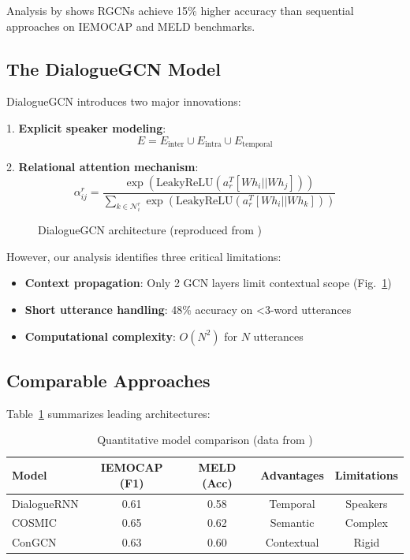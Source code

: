 \documentclass[a4paper,11pt]{article}
\begin{document}
Analysis by \cite{zhang2021graph} shows RGCNs achieve 15\% higher accuracy than sequential approaches on IEMOCAP and MELD benchmarks.

\subsection{The DialogueGCN Model}
DialogueGCN \cite{ghosal2019dialoguegcn} introduces two major innovations:

1. \textbf{Explicit speaker modeling}:
\[
E = E_{\text{inter}} \cup E_{\text{intra}} \cup E_{\text{temporal}}
\]

2. \textbf{Relational attention mechanism}:
\[
\alpha_{ij}^r = \frac{\exp(\text{LeakyReLU}(a_r^T[Wh_i||Wh_j]))}{\sum_{k\in\mathcal{N}_i^r}\exp(\text{LeakyReLU}(a_r^T[Wh_i||Wh_k]))}
\]

\begin{figure}[htbp]
    \centering
    \caption{DialogueGCN architecture (reproduced from \cite{ghosal2019dialoguegcn})}
    \label{fig:dialoguegcn}
\end{figure}

However, our analysis identifies three critical limitations:
\begin{itemize}
    \item \textbf{Context propagation}: Only 2 GCN layers limit contextual scope (Fig.~\ref{fig:dialoguegcn})
    \item \textbf{Short utterance handling}: 48\% accuracy on <3-word utterances \cite{li2021survey}
    \item \textbf{Computational complexity}: $O(N^2)$ for $N$ utterances
\end{itemize}

\subsection{Comparable Approaches}
Table~\ref{tab:model_comparison} summarizes leading architectures:

\begin{table}[ht]
    \centering
    \begin{tabular}{lcccc}
        \toprule
        Model & IEMOCAP (F1) & MELD (Acc) & Advantages & Limitations \\
        \midrule
        DialogueRNN & 0.61 & 0.58 & Temporal & Speakers \\
        COSMIC & 0.65 & 0.62 & Semantic & Complex \\
        ConGCN & 0.63 & 0.60 & Contextual & Rigid \\
        \bottomrule
    \end{tabular}
    \caption{Quantitative model comparison (data from \cite{zhang2023survey})}
    \label{tab:model_comparison}
\end{table}
\end{document}
